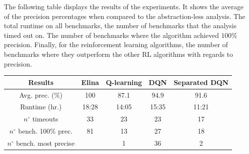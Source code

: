The following table displays the results of the experiments. It shows the average of the precision percentages when compared to the abstraction-less analysis. The total runtime on all benchmarks, the number of benchmarks that the analysis timed out on. The number of benchmarks where the algorithm achieved $100\%$ precision. Finally, for the reinforcement learning algorithms, the number of benchmarks where they outperform the other RL algorithms with regards to precision. 

\begin{center}
\begin{tabular}{||c c c c c||}
 
 \hline
 Results & Elina & Q-learning & DQN & Separated DQN \\ [0.5ex] 
 \hline\hline
 Avg. prec. (\%) & 100 & 87.1 & 94.9 & 91.6\\
 Runtime (hr.) & 18:28 & 14:05 & 15:35 & 11:21\\
 $n^{\circ}$ timeouts & 33 & 23 & 23 & 17\\
 $n^{\circ}$ bench. 100\% prec. & 81 & 13 & 27 & 18\\
 $n^{\circ}$ bench. most precise &  & 1 & 36 & 2\\
 
 \hline
\end{tabular}
\end{center}

